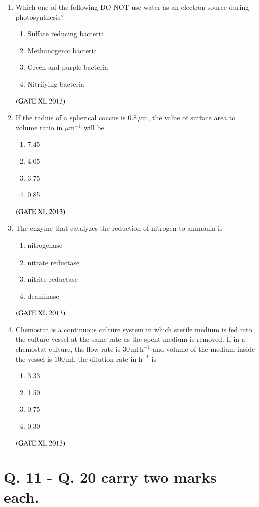 \documentclass[journal]{IEEEtran}
\begin{document}
\begin{enumerate}
\begin{enumerate}
\item Which one of the following DO NOT use water as an electron source during photosynthesis?
\begin{enumerate}
\item Sulfate reducing bacteria
\item Methanogenic bacteria
\item Green and purple bacteria
\item Nitrifying bacteria
\end{enumerate}
\hfill $\left(\text{GATE XL 2013}\right)$

\item If the radius of a spherical coccus is $0.8\,\mu\text{m}$, the value of surface area to volume ratio in $\mu\text{m}^{-1}$ will be
\begin{enumerate}
\item 7.45
\item 4.05
\item 3.75
\item 0.85
\end{enumerate}
\hfill $\left(\text{GATE XL 2013}\right)$

\item The enzyme that catalyzes the reduction of nitrogen to ammonia is
\begin{enumerate}
\item nitrogenase
\item nitrate reductase
\item nitrite reductase
\item deaminase
\end{enumerate}
\hfill $\left(\text{GATE XL 2013}\right)$

\item Chemostat is a continuous culture system in which sterile medium is fed into the culture vessel at the same rate as the spent medium is removed. If in a chemostat culture, the flow rate is $30\,\text{ml}\,\text{h}^{-1}$ and volume of the medium inside the vessel is $100\,\text{ml}$, the dilution rate in $\text{h}^{-1}$ is
\begin{enumerate}
\item 3.33
\item 1.50
\item 0.75
\item 0.30
\end{enumerate}
\hfill $\left(\text{GATE XL 2013}\right)$
\end{enumerate}

\section*{Q. 11 - Q. 20 carry two marks each.}


\end{enumerate}
\end{document}
